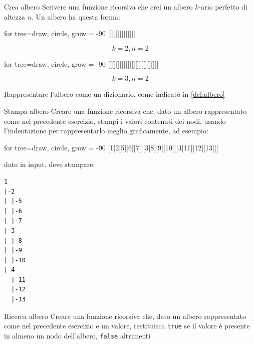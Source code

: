 \begin{esercizio}{Crea albero}
	Scrivere una funzione ricorsiva che crei un albero $ k $-ario perfetto di altezza $ n $. Un albero ha questa forma:
	\vskip3mm
	\begin{minipage}[t]{0.48\textwidth}
		\begin{center}
			\begin{forest}
				for tree={draw, circle, grow = -90}
				[[[][]][[][]]]
			\end{forest}
			\[
				k = 2, n = 2
			\]
		\end{center}
	\end{minipage}
	\begin{minipage}[t]{0.48\textwidth}
		\begin{center}
			\begin{forest}
				for tree={draw, circle, grow = -90}
				[[[][][]][[][][]][[][][]]]
			\end{forest}
			\[
				k = 3, n = 2
			\]
		\end{center}
	\end{minipage}
	\vskip3mm
	Rappresentare l'albero come un dizionario, come indicato in \cref{def:albero}
\end{esercizio}

\begin{esercizio}{Stampa albero}
	Creare una funzione ricorsiva che, dato un albero rappresentato come nel precedente esercizio, stampi i valori contenuti dei nodi, usando l'indentazione per rappresentarlo meglio graficamente, ad esempio:
	\begin{center}
		\begin{forest}
			for tree={draw, circle, grow = -90}
			[1[2[5][6][7]][3[8][9][10]][4[11][12][13]]]
		\end{forest}
	\end{center}
	dato in input, deve stampare:
	\begin{lstlisting}[frame = none]
1
|-2
| |-5
| |-6
| |-7
|-3
| |-8
| |-9
| |-10
|-4
  |-11
  |-12
  |-13
  \end{lstlisting}
\end{esercizio}


\begin{esercizio}{Ricerca albero}
	Creare una funzione ricorsiva che, dato un albero rappresentato come nel precedente esercizio e un valore, restituisca \verb|true| se il valore è presente in almeno un nodo dell'albero, \verb|false| altrimenti
\end{esercizio}


